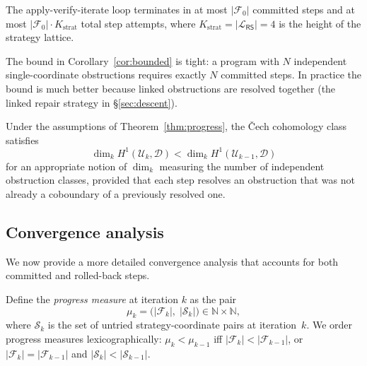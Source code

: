 \documentclass[11pt]{article}
\newcommand{\RF}{\mathcal{F}}               %
\newcommand{\RS}{\mathsf{RS}}               %
\newcommand{\hone}{H^1}                     %
\begin{document}
\begin{corollary}
\label{cor:bounded}
The apply-verify-iterate loop terminates in at most $|\RF_0|$ committed steps
and at most $|\RF_0| \cdot K_{\mathrm{strat}}$ total step attempts, where
$K_{\mathrm{strat}} = |\mathcal{L}_\RS| = 4$ is the height of the strategy
lattice.
\end{corollary}

\begin{remark}
The bound in Corollary~\ref{cor:bounded} is tight: a program with $N$
independent single-coordinate obstructions requires exactly $N$ committed
steps.  In practice the bound is much better because linked obstructions
are resolved together (\cf the linked repair strategy in \S\ref{sec:descent}).
\end{remark}

\begin{corollary}
\label{cor:h1-decrease}
Under the assumptions of Theorem~\ref{thm:progress}, the Čech cohomology
class satisfies
\[
  \dim_k \hone(\mathcal{U}_k, \mathcal{D}) < \dim_k \hone(\mathcal{U}_{k-1}, \mathcal{D})
\]
for an appropriate notion of $\dim_k$ measuring the number of independent
obstruction classes, provided that each step resolves an obstruction that was
not already a coboundary of a previously resolved one.
\end{corollary}

\subsection{Convergence analysis}
\label{subsec:convergence}

We now provide a more detailed convergence analysis that accounts for
both committed and rolled-back steps.

\begin{definition}
\label{def:progress-measure}
Define the \emph{progress measure} at iteration $k$ as the pair
\[
  \mu_k = \bigl(|\RF_k|,\; |\mathcal{S}_k|\bigr)
  \in \mathbb{N} \times \mathbb{N},
\]
where $\mathcal{S}_k$ is the set of untried strategy-coordinate pairs at
iteration~$k$.  We order progress measures lexicographically:
$\mu_k < \mu_{k-1}$ iff $|\RF_k| < |\RF_{k-1}|$, or $|\RF_k| = |\RF_{k-1}|$
and $|\mathcal{S}_k| < |\mathcal{S}_{k-1}|$.
\end{definition}
\end{document}
